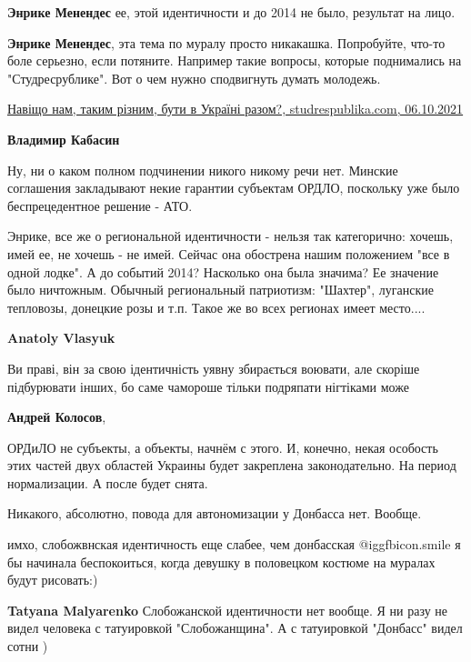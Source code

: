 \begin{itemize}
\begin{itemize}
\textbf{Энрике Менендес} ее, этой идентичности и до 2014 не было, результат на лицо.

\textbf{Энрике Менендес}, эта тема по муралу просто никакашка.
Попробуйте, что-то боле серьезно, если потяните.
Например такие вопросы, которые поднимались на "Студресрублике".
Вот о чем нужно сподвигнуть думать молодежь.

\href{https://studrespublika.com/buty-razom/}{%
Навіщо нам, таким різним, бути в Україні разом?, studrespublika.com, 06.10.2021%
}

\textbf{Владимир Кабасин} 

Ну, ни о каком полном подчинении никого никому речи нет. Минские соглашения
закладывают некие гарантии субъектам ОРДЛО, поскольку уже было беспрецедентное
решение - АТО.


Энрике, все же о региональной идентичности - нельзя так категорично: хочешь,
имей ее, не хочешь - не имей. Сейчас она обострена нашим положением "все в
одной лодке". А до событий 2014? Насколько она была значима? Ее значение было
ничтожным. Обычный региональный патриотизм: "Шахтер", луганские тепловозы,
донецкие розы и т.п. Такое же во всех регионах имеет место....

\textbf{Anatoly Vlasyuk} 

Ви праві, він за свою ідентичність уявну збирається воювати, але скоріше
підбурювати інших, бо саме чамороше тільки подряпати нігтіками може

\textbf{Андрей Колосов}, 

ОРДиЛО не субъекты, а объекты, начнём с этого. И, конечно, некая особость этих
частей двух областей Украины будет закреплена законодательно. На период
нормализации. А после будет снята.

Никакого, абсолютно, повода для автономизации у Донбасса нет. Вообще.

\end{itemize} %


имхо, слобожвнская идентичность еще слабее, чем донбасская  @igg{fbicon.smile}  я бы начинала
беспокоиться, когда девушку в половецком костюме на муралах будут рисовать:)

\begin{itemize} %
\textbf{Tatyana Malyarenko} Слобожанской идентичности нет вообще. Я ни разу не видел человека с татуировкой "Слобожанщина". А с татуировкой "Донбасс" видел сотни )


\end{itemize}
\end{itemize}
